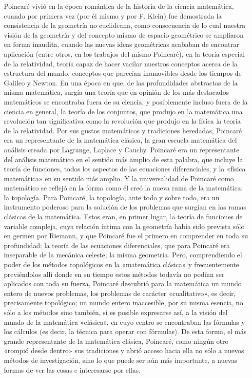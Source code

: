 \documentclass[a4paper, 12pt]{article}
\begin{document}
Poincaré vivió en la época romántica de la historia de la ciencia matemática, cuando por primera vez
(por él mismo y por F. Klein) fue demostrada la consistencia de la geometría no euclideana, como consecuencia de lo cual nuestra visión de la geometría y del 
concepto mismo de espacio geométrico se ampliaron en 
forma inaudita, cuando las nuevas ideas geométricas acababan de encontrar aplicación (entre otros, en los trabajos del mismo Poincaré), en la teoría especial de la relatividad, teoría capaz de hacer vacilar nuestros conceptos acerca de la estructura del mundo, conceptos que parecían inamovibles desde los tiempos de
Galileo y Newton. En una época en que, de las profundidades abstractas de la misma matemática, surgía una teoría que en opinión de los más destacados matemáticos se encontraba fuera de su ciencia, y posiblemente incluso fuera de la ciencia en general, la teoría de
los conjuntos, que produjo en la matemática una revolución tan significativa como la revolución que produjo en la física la teoría de la relatividad. Por sus gustos matemáticos y tradiciones heredadas, Poincaré era un representante de la matemática clásica, la gran escuela matemática del análisis creada por Lagrange, Laplace y Cauchy. Poincaré era un representante del análisis matemático en el sentido más amplio de esta palabra, que incluye la teoría de funciones, todos los aspectos de las ecuaciones diferenciales, y la «física matemática» en su sentido más amplio. Y la universalidad de Poincaré como matemático se reflejó en la forma como él creó la nueva rama de la matemática: la topología. Para Poincaré, la topología, ante todo y sobre todo, era un instrumento poderoso para la solución de los problemas que surgían en las ramas clásicas de la matemática. Estos eran, en primer lugar, la teoría de funciones de variable compleja, cuya relación  íntima con la geometría había sido prevista sólo en  germen por Riemann, y que Poincaré fue el primero en
comprender en toda su profundidad; la teoría de las  ecuaciones diferenciales, que para Poincaré era inseparable de la mecánica celeste; la misma geometría.  Pero, comprendiendo el poder de los métodos topológicos en la «matemática clásica» y frecuentemente previéndolos allí donde en su tiempo estos métodos todavía no podían ser aplicados con toda su fuerza, Poincaré descubrió para la matemática un mundo entero de nuevos problemas, los problemas de carácter «cualitativo», es decir, precisamente topológico; un mundo entero inaccesible, por su misma esencia, no sólo a los métodos sino también, si es posible expresarse así, a la visión del mundo de la matemática «clásica», en cuyo centro se encontraban las fórmulas y los cálculos (es decir, la técnica para operar con fórmulas). De  esta forma, el más grande representante de la matemática clásica, Poincaré, como ningún otro «rompió desde dentro» sus tradiciones y abrió acceso hacia ella no sólo a nuevos métodos de investigación, sino lo  que puede ser aún más importante, a nuevas formas de ver las cosas e interesarse por ellas.
\end{document}
